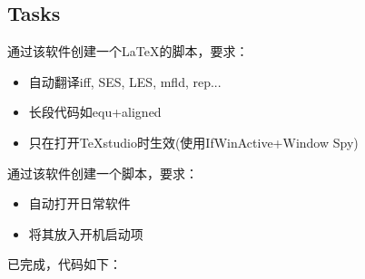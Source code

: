 \documentclass[11pt]{amsart}
\begin{document}
\subsection{Tasks}
通过该软件创建一个\LaTeX 的脚本，要求：
\begin{itemize}
	\item 自动翻译iff, SES, LES, mfld, rep...
	\item 长段代码如equ+aligned
	\item 只在打开TeXstudio时生效(使用IfWinActive+Window Spy)
\end{itemize}
通过该软件创建一个脚本，要求：
\begin{itemize}
	\item 自动打开日常软件
	\item 将其放入开机启动项
\end{itemize}
已完成，代码如下：
\end{document}
